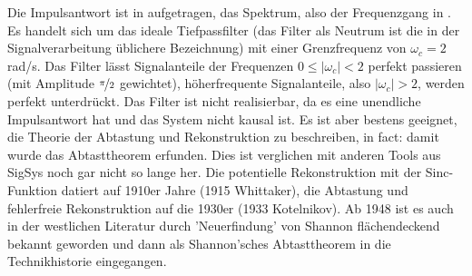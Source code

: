 \begin{Ansatz}
Die Impulsantwort ist in  aufgetragen,
das Spektrum, also der Frequenzgang in .
Es handelt sich um das ideale Tiefpassfilter (das Filter als Neutrum ist die in der
Signalverarbeitung üblichere Bezeichnung) mit einer Grenzfrequenz von $\omega_c=2$ rad/s.
Das Filter lässt Signalanteile der Frequenzen $0\leq |\omega_c|<2$ perfekt passieren
(mit Amplitude $\nicefrac{\pi}{2}$ gewichtet), höherfrequente
Signalanteile, also $|\omega_c|>2$, werden perfekt unterdrückt.
Das Filter ist nicht realisierbar, da es eine unendliche Impulsantwort hat
und das System nicht kausal ist.
Es ist aber bestens geeignet, die Theorie der Abtastung und Rekonstruktion
zu beschreiben, in fact: damit wurde das Abtasttheorem erfunden. Dies ist verglichen
mit anderen Tools aus SigSys noch gar nicht so lange her. Die potentielle
Rekonstruktion mit der Sinc-Funktion datiert auf 1910er Jahre (1915 Whittaker),
die Abtastung und fehlerfreie Rekonstruktion auf die 1930er (1933 Kotelnikov).
Ab 1948 ist es auch in der westlichen Literatur durch 'Neuerfindung' von Shannon
flächendeckend bekannt geworden und dann als Shannon'sches Abtasttheorem in die
Technikhistorie eingegangen.
\end{Ansatz}
